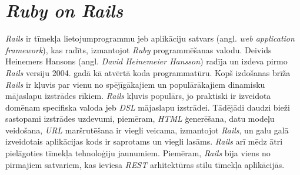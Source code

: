 
\chapter{\textit{Ruby on Rails}}
\textit{Rails} ir tīmekļa lietojumprogrammu jeb aplikāciju satvars (angl. \textit{web application framework}), kas radīts, izmantojot \textit{Ruby} programmēšanas valodu. Deivids Heinemers Hansons (angl. \textit{David Heinemeier Hansson}) radīja un izdeva pirmo \textit{Rails} versiju 2004. gadā kā atvērtā koda programmatūru. Kopš izdošanas brīža \textit{Rails} ir kļuvis par vienu no spējīgākajiem un populārākajiem dinamisku mājaslapu izstrādes rīkiem. \textit{Rails} kļuvis populārs, jo praktiski ir izveidota domēnam specifiska valoda jeb \textit{DSL}  mājaslapu izstrādei. Tādējādi daudzi bieži sastopami izstrādes uzdevumi, piemēram, \textit{HTML}  ģenerēšana, datu modeļu veidošana, \textit{URL}  maršrutēšana ir viegli veicama, izmantojot \textit{Rails}, un galu galā izveidotais aplikācijas kods ir saprotams un viegli lasāms. \textit{Rails} arī mēdz ātri pielāgoties tīmekļa tehnoloģiju jaunumiem. Piemēram, \textit{Rails} bija viens no pirmajiem satvariem, kas ieviesa \textit{REST}  arhitektūras stilu tīmekļa aplikācijās.

